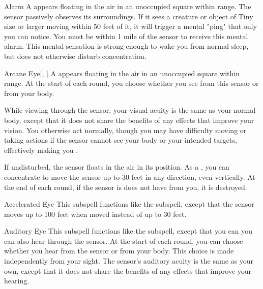 \begin{ability}[\nth{1}]{Alarm}
A  appears floating in the air in an unoccupied square within \rngmed range.
The sensor passively observes its surroundings.
If it sees a creature or object of Tiny size or larger moving within 50 feet of it, it will trigger a mental "ping" that only you can notice.
You must be within 1 mile of the sensor to receive this mental alarm.
This mental sensation is strong enough to wake you from normal sleep, but does not otherwise disturb concentration.
\end{ability}
\vspace{0.25em}


\begin{ability}[\nth{1}]{Arcane Eye}[, ]
A  appears floating in the air in an unoccupied square within \rngmed range.
At the start of each round, you choose whether you see from this sensor or from your body.

While viewing through the sensor, your visual acuity is the same as your normal body, except that it does not share the benefits of any  effects that improve your vision.
You otherwise act normally, though you may have difficulty moving or taking actions if the sensor cannot see your body or your intended targets, effectively making you \blinded.

If undisturbed, the sensor floats in the air in its position.
As a , you can concentrate to move the sensor up to 30 feet in any direction, even vertically.
At the end of each round, if the sensor is does not have  from you, it is destroyed.
\end{ability}
\vspace{0.25em}


\begin{ability}[\nth{2}]{Accelerated Eye}
This subspell functions like the  subspell, except that the sensor moves up to 100 feet when moved instead of up to 30 feet.
\end{ability}
\vspace{0.25em}


\begin{ability}[\nth{2}]{Auditory Eye}
This subspell functions like the  subspell, except that you can you can also hear through the sensor.
At the start of each round, you can choose whether you hear from the sensor or from your body.
This choice is made independently from your sight.
The sensor's auditory acuity is the same as your own, except that it does not share the benefits of any  effects that improve your hearing.
\end{ability}
\vspace{0.25em}



